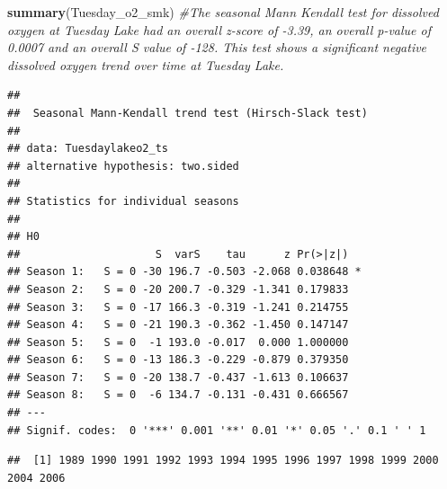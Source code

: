 \documentclass[12pt,]{article}
\newenvironment{Shaded}{\begin{snugshade}}{\end{snugshade}}
\newcommand{\KeywordTok}[1]{\textcolor[rgb]{0.13,0.29,0.53}{\textbf{#1}}}
\newcommand{\DataTypeTok}[1]{\textcolor[rgb]{0.13,0.29,0.53}{#1}}
\newcommand{\DecValTok}[1]{\textcolor[rgb]{0.00,0.00,0.81}{#1}}
\newcommand{\StringTok}[1]{\textcolor[rgb]{0.31,0.60,0.02}{#1}}
\newcommand{\CommentTok}[1]{\textcolor[rgb]{0.56,0.35,0.01}{\textit{#1}}}
\newcommand{\OperatorTok}[1]{\textcolor[rgb]{0.81,0.36,0.00}{\textbf{#1}}}
\newcommand{\NormalTok}[1]{#1}
\begin{document}
\begin{Shaded}
\begin{Highlighting}[]
\KeywordTok{summary}\NormalTok{(Tuesday_o2_smk) }\CommentTok{#The seasonal Mann Kendall test for dissolved oxygen at Tuesday Lake had an overall z-score of -3.39, an overall p-value of 0.0007 and an overall S value of -128. This test shows a significant negative dissolved oxygen trend over time at Tuesday Lake.}
\end{Highlighting}
\end{Shaded}

\begin{verbatim}
## 
##  Seasonal Mann-Kendall trend test (Hirsch-Slack test)
## 
## data: Tuesdaylakeo2_ts
## alternative hypothesis: two.sided
## 
## Statistics for individual seasons
## 
## H0
##                     S  varS    tau      z Pr(>|z|)  
## Season 1:   S = 0 -30 196.7 -0.503 -2.068 0.038648 *
## Season 2:   S = 0 -20 200.7 -0.329 -1.341 0.179833  
## Season 3:   S = 0 -17 166.3 -0.319 -1.241 0.214755  
## Season 4:   S = 0 -21 190.3 -0.362 -1.450 0.147147  
## Season 5:   S = 0  -1 193.0 -0.017  0.000 1.000000  
## Season 6:   S = 0 -13 186.3 -0.229 -0.879 0.379350  
## Season 7:   S = 0 -20 138.7 -0.437 -1.613 0.106637  
## Season 8:   S = 0  -6 134.7 -0.131 -0.431 0.666567  
## ---
## Signif. codes:  0 '***' 0.001 '**' 0.01 '*' 0.05 '.' 0.1 ' ' 1
\end{verbatim}

\begin{Shaded}
\end{Shaded}

\begin{verbatim}
##  [1] 1989 1990 1991 1992 1993 1994 1995 1996 1997 1998 1999 2000 2004 2006
\end{verbatim}

\begin{Shaded}
\end{Shaded}
\end{document}
